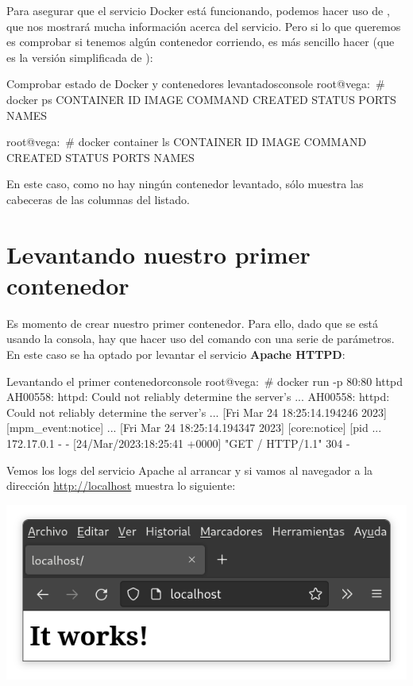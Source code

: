Para asegurar que el servicio Docker está funcionando, podemos hacer uso de , que nos mostrará mucha información acerca del servicio. Pero si lo que queremos es comprobar si tenemos algún contenedor corriendo, es más sencillo hacer  (que es la versión simplificada de  ):

\begin{mycode}{Comprobar estado de Docker y contenedores levantados}{console}{}
root@vega:~# docker ps
CONTAINER ID   IMAGE     COMMAND   CREATED   STATUS    PORTS     NAMES

root@vega:~# docker container ls
CONTAINER ID   IMAGE     COMMAND   CREATED   STATUS    PORTS     NAMES
\end{mycode}

En este caso, como no hay ningún contenedor levantado, sólo muestra las cabeceras de las columnas del listado.

\section{Levantando nuestro primer contenedor}
Es momento de crear nuestro primer contenedor. Para ello, dado que se está usando la consola, hay que hacer uso del comando  con una serie de parámetros. En este caso se ha optado por levantar el servicio \textbf{Apache HTTPD}:

\begin{mycode}{Levantando el primer contenedor}{console}{}
root@vega:~# docker run -p 80:80 httpd
AH00558: httpd: Could not reliably determine the server's ...
AH00558: httpd: Could not reliably determine the server's ...
[Fri Mar 24 18:25:14.194246 2023] [mpm_event:notice] ...
[Fri Mar 24 18:25:14.194347 2023] [core:notice] [pid  ...
172.17.0.1 - - [24/Mar/2023:18:25:41 +0000] "GET / HTTP/1.1" 304 -
\end{mycode}

Vemos los logs del servicio Apache al arrancar y si vamos al navegador a la dirección \href{http://localhost}{http://localhost} muestra lo siguiente:

\begin{center}
    \includegraphics[width=0.6\linewidth]{img/docker/apache.png}
\end{center}

